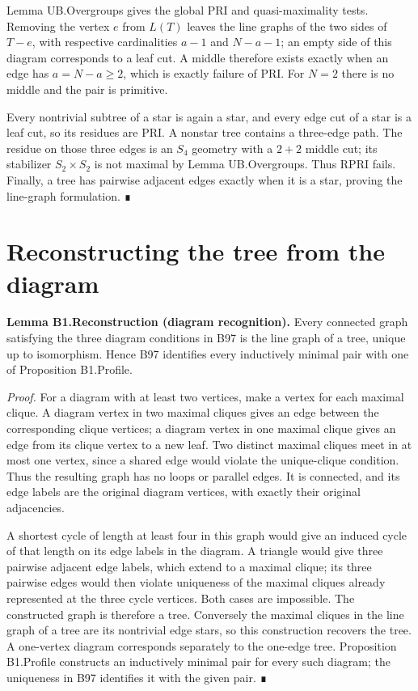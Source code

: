 Lemma UB.Overgroups gives the global PRI and quasi-maximality tests. Removing the vertex \(e\) from \(L(T)\) leaves the line graphs of the two sides of \(T-e\), with respective cardinalities \(a-1\) and \(N-a-1\); an empty side of this diagram corresponds to a leaf cut. A middle therefore exists exactly when an edge has \(a=N-a\geq2\), which is exactly failure of PRI. For \(N=2\) there is no middle and the pair is primitive.

Every nontrivial subtree of a star is again a star, and every edge cut of a star is a leaf cut, so its residues are PRI. A nonstar tree contains a three-edge path. The residue on those three edges is an \(S_4\) geometry with a \(2+2\) middle cut; its stabilizer \(S_2\times S_2\) is not maximal by Lemma UB.Overgroups. Thus RPRI fails. Finally, a tree has pairwise adjacent edges exactly when it is a star, proving the line-graph formulation. ∎
\section{Reconstructing the tree from the diagram}
\textbf{Lemma B1.Reconstruction (diagram recognition).} Every connected graph satisfying the three diagram conditions in B97 is the line graph of a tree, unique up to isomorphism. Hence B97 identifies every inductively minimal pair with one of Proposition B1.Profile.

\emph{Proof.} For a diagram with at least two vertices, make a vertex for each maximal clique. A diagram vertex in two maximal cliques gives an edge between the corresponding clique vertices; a diagram vertex in one maximal clique gives an edge from its clique vertex to a new leaf. Two distinct maximal cliques meet in at most one vertex, since a shared edge would violate the unique-clique condition. Thus the resulting graph has no loops or parallel edges. It is connected, and its edge labels are the original diagram vertices, with exactly their original adjacencies.

A shortest cycle of length at least four in this graph would give an induced cycle of that length on its edge labels in the diagram. A triangle would give three pairwise adjacent edge labels, which extend to a maximal clique; its three pairwise edges would then violate uniqueness of the maximal cliques already represented at the three cycle vertices. Both cases are impossible. The constructed graph is therefore a tree. Conversely the maximal cliques in the line graph of a tree are its nontrivial edge stars, so this construction recovers the tree. A one-vertex diagram corresponds separately to the one-edge tree. Proposition B1.Profile constructs an inductively minimal pair for every such diagram; the uniqueness in B97 identifies it with the given pair. ∎
